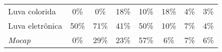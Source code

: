 \begin{table}[]
{\begin{tabular}{l|ccccccc}
            Luva colorida                                                                                        & 0\%                                                        & 0\%                                                     & \cellcolor[HTML]{FFF0D1}18\%                            & \cellcolor[HTML]{FFF6E5}10\%                            & \cellcolor[HTML]{FFF0D1}18\%                            & \cellcolor[HTML]{FFFCF5}4\%                             & \cellcolor[HTML]{FFFCF7}3\%                             \\
            Luva eletrônica                                                                                      & \cellcolor[HTML]{FFD47F}50\%                               & \cellcolor[HTML]{FFC249}71\%                            & \cellcolor[HTML]{FFDC96}41\%                            & \cellcolor[HTML]{FFD47F}50\%                            & \cellcolor[HTML]{FFF6E5}10\%                            & \cellcolor[HTML]{FFF9ED}7\%                             & \cellcolor[HTML]{FFFCF5}4\%                             \\
            \textit{Mocap}                                                                                       & 0\%                                                        & \cellcolor[HTML]{FFE6B5}29\%                            & \cellcolor[HTML]{FFEBC4}23\%                            & \cellcolor[HTML]{FFCE6D}57\%                            & \cellcolor[HTML]{FFFAF0}6\%                             & \cellcolor[HTML]{FFF9ED}7\%                             & \cellcolor[HTML]{FFFAF0}6\%                             \\ \hline
        \end{tabular}%
    }
\end{table}